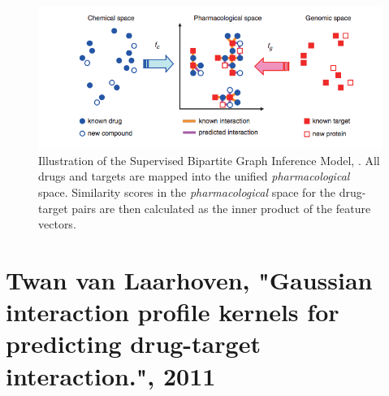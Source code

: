 \begin{figure}
\begin{center}
\includegraphics[scale=0.65]{yamanishi_related.png}
\end{center}
\caption[Illustration of Supervised Bipartite Graph Inference Method]{\large{Illustration of the Supervised Bipartite Graph Inference Model, \cite{yamanishi2008prediction}. All drugs and targets are mapped into the unified \textit{pharmacological} space. Similarity scores in the \textit{pharmacological} space for the drug-target pairs are then calculated as the inner product of the feature vectors.}}
\label{fig:yamanishi_1}
\end{figure}

\section{Twan van Laarhoven, "Gaussian interaction profile kernels for predicting drug-target interaction.", 2011}
\label{rlskron}

